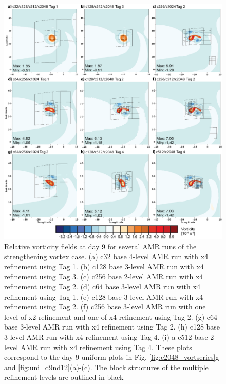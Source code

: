 \begin{figure}
   \centerline{%
   \noindent
   \includegraphics[width=\textwidth]{Chap2/day9_vort-01.eps}}
   \caption{Relative vorticity fields at day 9 for several AMR runs of the 
   strengthening vortex case. (a) c32 base 4-level AMR run with x4 
   refinement using Tag 1. (b) c128 base 3-level AMR run with
   x4 refinement using Tag 3.
   (c) c256 base 2-level AMR run with x4 refinement using Tag 2.
   (d) c64 base 3-level AMR run with x4 refinement using Tag 1.
   (e) c128 base 3-level AMR run with x4 refinement using Tag 2.
   (f) c256 base 3-level AMR run with one level of x2 refinement 
   and one of x4 refinement using Tag 2.
   (g) c64 base 3-level AMR run with x4 refinement using Tag 2.
   (h) c128 base 3-level AMR run with x4 refinement using Tag 4.
   (i) a c512 base 2-level AMR run with x4 refinement using Tag 4. These plots
   correspond to the day 9 uniform plots in Fig. \ref{fig:c2048_vortseries}g and
   \ref{fig:uni_d9nd12}(a)-(c). The block structures of the multiple refinement
   levels are outlined in black
   }
   \label{fig:vort_amr_day9}
\end{figure}


